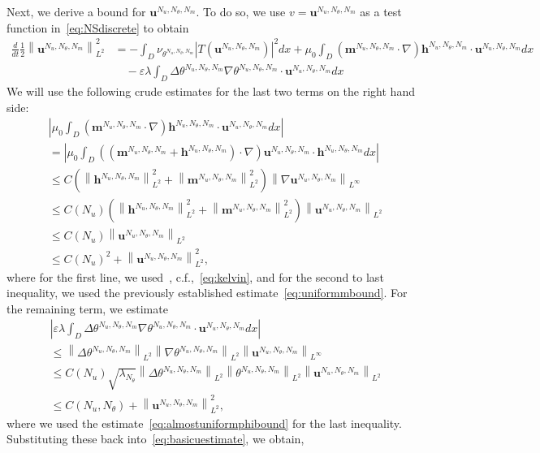 \documentclass[10pt,letterpaper,twoside]{amsart}
\theoremstyle{definition}{\newtheorem{definition}[lemma]{Definition}}
\theoremstyle{note}{\newtheorem{claim}{Claim}[section]
\newtheorem*{claim*}{Claim}}
\numberwithin{equation}{section}
\newcommand{\dom}{D}
\newcommand{\norm}[1]{\left\| #1 \right\|}
\newcommand{\Grad}{\nabla}
\newcommand{\bma}{\mathbf{m}^{N_u,N_\theta,N_m}}
\newcommand{\bha}{\mathbf{h}^{N_u,N_\theta,N_m}}
\newcommand{\bua}{\mathbf{u}^{N_u,N_\theta,N_m}}
\newcommand{\tha}{\theta^{N_u,N_\theta,N_m}}
\begin{document}
Next, we derive  a bound for $\bua$. To do so,
we use $v=\bua$ as a test function in~\eqref{eq:NSdiscrete} to obtain
\begin{equation}
	\label{eq:basicuestimate}
	\begin{split}
		\frac{d}{dt}\frac12\norm{\bua}_{L^2}^2&
	= -\int_{\dom}\nu_{\tha} |T(\bua)|^2 dx + \mu_0 \int_{\dom} (\bma\cdot\Grad)\bha \cdot \bua dx \\
	&\quad -\varepsilon\lambda\int_{\dom} \Delta\tha \Grad\tha\cdot\bua dx
	\end{split}
\end{equation}
We will use the following crude estimates for the last two terms on the right hand side:
\begin{align*}
	&\left|   \mu_0 \int_{\dom} (\bma\cdot\Grad)\bha \cdot \bua dx  \right| \\
	 &= 	\left|   \mu_0 \int_{\dom} ((\bma+\bha)\cdot\Grad)\bua\cdot \bha dx  \right| \\
	& \leq C\left(\norm{\bha}_{L^2}^2 +\norm{\bma}_{L^2}^2\right)\norm{\Grad \bua}_{L^\infty}\\
	& \leq C(N_u) \left(\norm{\bha}_{L^2}^2 +\norm{\bma}_{L^2}^2\right)\norm{\bua}_{L^2}\\
	& \leq C(N_u) \norm{\bua}_{L^2}\\
	& \leq C(N_u)^2 + \norm{\bua}^2_{L^2},
\end{align*}
where for the first line, we used~\cite[Lemma 2.3]{Nochetto2019}, c.f.,~\eqref{eq:kelvin}, and for the second to last inequality, we used the previously established estimate~\eqref{eq:uniformmbound}. For the remaining term, we estimate
\begin{align*}
	&\left|\varepsilon\lambda\int_{\dom} \Delta\tha \Grad\tha\cdot\bua dx\right|\\
	& \leq \norm{\Delta \tha}_{L^2}\norm{\Grad\tha}_{L^2}\norm{\bua}_{L^\infty}\\
	& \leq C(N_u)\sqrt{\lambda_{N_\theta}} \norm{\Delta\tha}_{L^2}\norm{\tha}_{L^2}\norm{\bua}_{L^2}\\
	& \leq C(N_u,N_\theta)
    + \norm{\bua}_{L^2}^2,
\end{align*}
where we used the estimate~\eqref{eq:almostuniformphibound} for the last inequality. Substituting these back into~\eqref{eq:basicuestimate}, we obtain,
\end{document}
